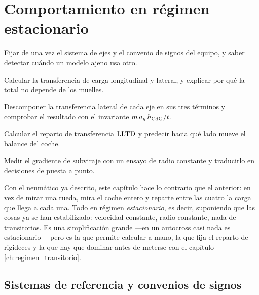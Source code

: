 \chapter{Comportamiento en régimen estacionario}
\label{ch:regimen_estacionario}

\begin{objetivos}
  \item Fijar de una vez el sistema de ejes y el convenio de signos del
        equipo, y saber detectar cuándo un modelo ajeno usa otro.
  \item Calcular la transferencia de carga longitudinal y lateral, y explicar
        por qué la total no depende de los muelles.
  \item Descomponer la transferencia lateral de cada eje en sus tres términos y
        comprobar el resultado con el invariante $m\,a_y\,h_{\mathrm{CdG}}/t$.
  \item Calcular el reparto de transferencia $\mathrm{LLTD}$ y predecir hacia qué lado
        mueve el balance del coche.
  \item Medir el gradiente de subviraje con un ensayo de radio constante y
        traducirlo en decisiones de puesta a punto.
\end{objetivos}


Con el neumático ya descrito, este capítulo hace lo contrario que el anterior:
en vez de mirar una rueda, mira el coche entero y reparte entre las cuatro la
carga que llega a cada una. Todo en régimen \emph{estacionario}, es decir,
suponiendo que las cosas ya se han estabilizado: velocidad constante, radio
constante, nada de transitorios. Es una simplificación grande ---en un
autocross casi nada es estacionario--- pero es la que permite calcular a mano,
la que fija el reparto de rigideces y la que hay que dominar antes de meterse
con el capítulo \ref{ch:regimen_transitorio}.

\section{Sistemas de referencia y convenios de signos}
\label{sec:regimen_estacionario:01}


